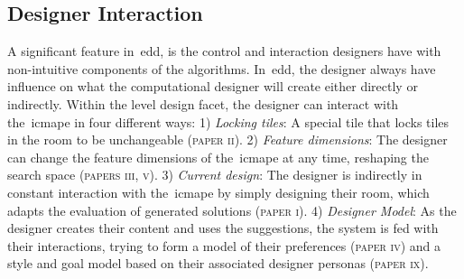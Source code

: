 






\subsection{Designer Interaction}
\label{sec:desInteraction}

A significant feature in~\acrshort{edd}, is the control and interaction designers have with non-intuitive components of the algorithms. In~\acrshort{edd}, the designer always have influence on what the computational designer will create either directly or indirectly. Within the level design facet, the designer can interact with the~\acrshort{icmape} in four different ways: 1) \emph{Locking tiles}: A special tile that locks tiles in the room to be unchangeable (\textsc{paper ii}). 2) \emph{Feature dimensions}: The designer can change the feature dimensions of the~\acrshort{icmape} at any time, reshaping the search space (\textsc{papers iii, v}). 3) \emph{Current design}: The designer is indirectly in constant interaction with the~\acrshort{icmape} by simply designing their room, which adapts the evaluation of generated solutions (\textsc{paper i}). 4) \emph{Designer Model}: As the designer creates their content and uses the suggestions, the system is fed with their interactions, trying to form a model of their preferences (\textsc{paper iv}) and a style and goal model based on their associated designer personas (\textsc{paper ix}).

